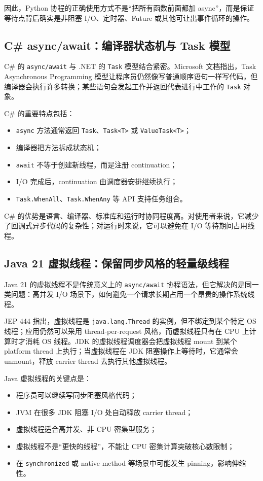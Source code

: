 \documentclass[UTF8,zihao=-4]{ctexart}
\begin{document}
因此，Python 协程的正确使用方式不是“把所有函数前面都加 async”，而是保证等待点背后确实是非阻塞 I/O、定时器、Future 或其他可让出事件循环的操作。

\subsection{C\# async/await：编译器状态机与 Task 模型}

C\# 的 \texttt{async/await} 与 .NET 的 \texttt{Task} 模型结合紧密。Microsoft 文档指出，Task Asynchronous Programming 模型让程序员仍然像写普通顺序语句一样写代码，但编译器会执行许多转换；某些语句会发起工作并返回代表进行中工作的 \texttt{Task} 对象\cite{csharp-async}。

C\# 的重要特点包括：
\begin{itemize}
  \item \texttt{async} 方法通常返回 \texttt{Task}、\texttt{Task<T>} 或 \texttt{ValueTask<T>}；
  \item 编译器把方法拆成状态机；
  \item \texttt{await} 不等于创建新线程，而是注册 continuation；
  \item I/O 完成后，continuation 由调度器安排继续执行；
  \item \texttt{Task.WhenAll}、\texttt{Task.WhenAny} 等 API 支持任务组合。
\end{itemize}

C\# 的优势是语言、编译器、标准库和运行时协同程度高。对使用者来说，它减少了回调式异步代码的复杂性；对运行时来说，它可以避免在 I/O 等待期间占用线程。

\subsection{Java 21 虚拟线程：保留同步风格的轻量级线程}

Java 21 的虚拟线程不是传统意义上的 \texttt{async/await} 协程语法，但它解决的是同一类问题：高并发 I/O 场景下，如何避免一个请求长期占用一个昂贵的操作系统线程。

JEP 444 指出，虚拟线程是 \texttt{java.lang.Thread} 的实例，但不绑定到某个特定 OS 线程；应用仍然可以采用 thread-per-request 风格，而虚拟线程只有在 CPU 上计算时才消耗 OS 线程\cite{jep444}。JDK 的虚拟线程调度器会把虚拟线程 mount 到某个 platform thread 上执行；当虚拟线程在 JDK 阻塞操作上等待时，它通常会 unmount，释放 carrier thread 去执行其他虚拟线程\cite{jep444-mount}。

Java 虚拟线程的关键点是：
\begin{itemize}
  \item 程序员可以继续写同步阻塞风格代码；
  \item JVM 在很多 JDK 阻塞 I/O 处自动释放 carrier thread；
  \item 虚拟线程适合高并发、非 CPU 密集型服务；
  \item 虚拟线程不是“更快的线程”，不能让 CPU 密集计算突破核心数限制；
  \item 在 \texttt{synchronized} 或 native method 等场景中可能发生 pinning，影响伸缩性。
\end{itemize}
\end{document}
